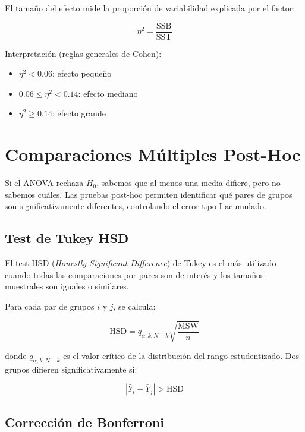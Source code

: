 \documentclass[11pt,a4paper]{article}
\theoremstyle{definition}
\begin{document}
El tamaño del efecto mide la proporción de variabilidad explicada por el factor:

\begin{equation}
\eta^2 = \frac{\text{SSB}}{\text{SST}}
\end{equation}

Interpretación (reglas generales de Cohen):
\begin{itemize}
    \item $\eta^2 < 0.06$: efecto pequeño
    \item $0.06 \leq \eta^2 < 0.14$: efecto mediano
    \item $\eta^2 \geq 0.14$: efecto grande
\end{itemize}

\section{Comparaciones Múltiples Post-Hoc}

Si el ANOVA rechaza $H_0$, sabemos que al menos una media difiere, pero no sabemos cuáles. Las pruebas post-hoc permiten identificar qué pares de grupos son significativamente diferentes, controlando el error tipo I acumulado.

\subsection{Test de Tukey HSD}

El test HSD (\textit{Honestly Significant Difference}) de Tukey es el más utilizado cuando todas las comparaciones por pares son de interés y los tamaños muestrales son iguales o similares.

Para cada par de grupos $i$ y $j$, se calcula:

\begin{equation}
\text{HSD} = q_{\alpha, k, N-k} \sqrt{\frac{\text{MSW}}{n}}
\end{equation}

donde $q_{\alpha, k, N-k}$ es el valor crítico de la distribución del rango estudentizado. Dos grupos difieren significativamente si:

\begin{equation}
|\bar{Y}_i - \bar{Y}_j| > \text{HSD}
\end{equation}

\subsection{Corrección de Bonferroni}
\end{document}
